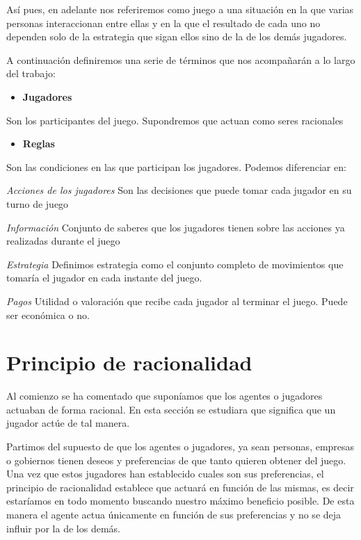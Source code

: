 \documentclass[12pt,a4paper,]{book}
\providecommand{\tightlist}{%
  \setlength{\itemsep}{0pt}\setlength{\parskip}{0pt}}
\numberwithin{dummy}{section}
\theoremstyle{ocrenumbox}
\theoremstyle{blacknumex}
\theoremstyle{blacknumbox}
\theoremstyle{ocrenum}
\theoremstyle{ocrenum}
\begin{document}
Así pues, en adelante nos referiremos como juego a una situación en la
que varias personas interaccionan entre ellas y en la que el resultado
de cada uno no dependen solo de la estrategia que sigan ellos sino de la
de los demás jugadores.

A continuación definiremos una serie de términos que nos acompañarán a
lo largo del trabajo:

\begin{itemize}
\tightlist
\item
  \textbf{Jugadores}
\end{itemize}

Son los participantes del juego. Supondremos que actuan como seres
racionales

\begin{itemize}
\tightlist
\item
  \textbf{Reglas}
\end{itemize}

Son las condiciones en las que participan los jugadores. Podemos
diferenciar en:

\emph{Acciones de los jugadores} Son las decisiones que puede tomar cada
jugador en su turno de juego

\emph{Información} Conjunto de saberes que los jugadores tienen sobre
las acciones ya realizadas durante el juego

\emph{Estrategia} Definimos estrategia como el conjunto completo de
movimientos que tomaría el jugador en cada instante del juego.

\emph{Pagos} Utilidad o valoración que recibe cada jugador al terminar
el juego. Puede ser económica o no.

\hypertarget{Seccion12}{%
\section{Principio de racionalidad}\label{Seccion12}}

Al comienzo se ha comentado que suponíamos que los agentes o jugadores
actuaban de forma racional. En esta sección se estudiara que significa
que un jugador actúe de tal manera.

Partimos del supuesto de que los agentes o jugadores, ya sean personas,
empresas o gobiernos tienen deseos y preferencias de que tanto quieren
obtener del juego. Una vez que estos jugadores han establecido cuales
son sus preferencias, el principio de racionalidad establece que actuará
en función de las mismas, es decir estaríamos en todo momento buscando
nuestro máximo beneficio posible. De esta manera el agente actua
únicamente en función de sus preferencias y no se deja influir por la de
los demás.
\end{document}
